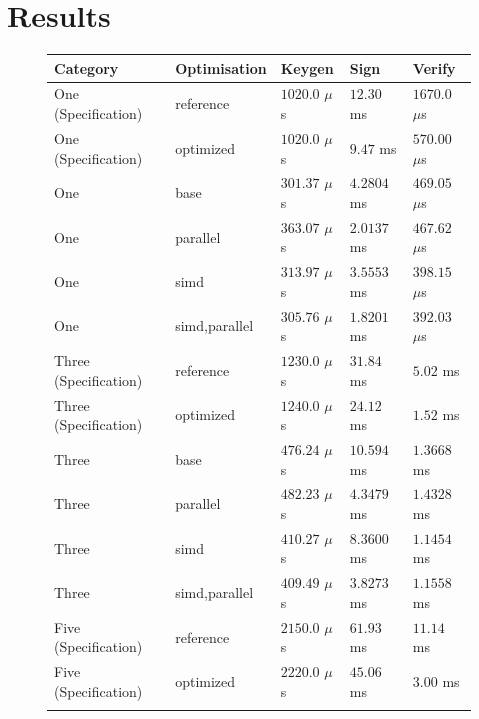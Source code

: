 \documentclass[11pt]{report}
\theoremstyle{definition}
\theoremstyle{plain}
\begin{document}
\section{Results}\label{sub:results}

\begin{figure}
  \centering
  \begin{tabular}{l|l|lll}
    \hline
    Category              & Optimisation  & Keygen          & Sign        & Verify          \\
    \hline
    \hline
    One (Specification)   & reference     & $1020.0$ $\mu$s & $12.30$ ms  & $1670.0$ $\mu$s \\
    One (Specification)   & optimized     & $1020.0$ $\mu$s & $9.47$ ms   & $570.00$ $\mu$s \\
    \arrayrulecolor{lightgray}\hline\arrayrulecolor{black}
    One                   & base          & $301.37$ $\mu$s & $4.2804$ ms & $469.05$ $\mu$s \\
    One                   & parallel      & $363.07$ $\mu$s & $2.0137$ ms & $467.62$ $\mu$s \\
    One                   & simd          & $313.97$ $\mu$s & $3.5553$ ms & $398.15$ $\mu$s \\
    One                   & simd,parallel & $305.76$ $\mu$s & $1.8201$ ms & $392.03$ $\mu$s \\
    \hline
    Three (Specification) & reference     & $1230.0$ $\mu$s & $31.84$ ms  & $5.02$ ms       \\
    Three (Specification) & optimized     & $1240.0$ $\mu$s & $24.12$ ms  & $1.52$ ms       \\
    \arrayrulecolor{lightgray}\hline\arrayrulecolor{black}
    Three                 & base          & $476.24$ $\mu$s & $10.594$ ms & $1.3668$ ms     \\
    Three                 & parallel      & $482.23$ $\mu$s & $4.3479$ ms & $1.4328$ ms     \\
    Three                 & simd          & $410.27$ $\mu$s & $8.3600$ ms & $1.1454$ ms     \\
    Three                 & simd,parallel & $409.49$ $\mu$s & $3.8273$ ms & $1.1558$ ms     \\
    \hline
    Five (Specification)  & reference     & $2150.0$ $\mu$s & $61.93$ ms  & $11.14$ ms      \\
    Five (Specification)  & optimized     & $2220.0$ $\mu$s & $45.06$ ms  & $3.00$ ms       \\
    \arrayrulecolor{lightgray}\hline\arrayrulecolor{black}

\end{tabular}
\end{figure}
\end{document}
